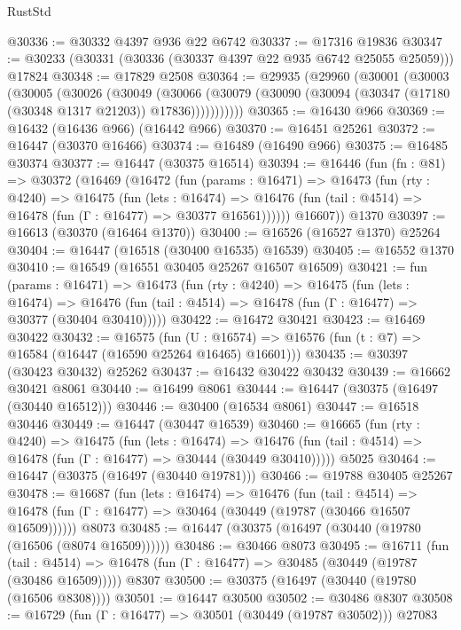 \begin{lexlean}{RustStd}
\begin{coremodule}
{\begin{coremodule}
{{{{{{{{{{{{{{{{{{{{{{{{{{{{{{{{{{{{{{{{{{{{{{{{{{{{{{{@30336 := @30332 @4397 @936 @22 @6742
@30337 := @17316 @19836
@30347 := @30233 (@30331 (@30336 (@30337 @4397 @22 @935 @6742 @25055 @25059))) @17824
@30348 := @17829 @2508
@30364 := @29935
    (@29960
      (@30001
        (@30003
          (@30005
            (@30026
              (@30049
                (@30066
                  (@30079 (@30090 (@30094 (@30347 (@17180 (@30348 @1317 @21203)) @17836)))))))))))
@30365 := @16430 @966
@30369 := @16432 (@16436 @966) (@16442 @966)
@30370 := @16451 @25261
@30372 := @16447 (@30370 @16466)
@30374 := @16489 (@16490 @966)
@30375 := @16485 @30374
@30377 := @16447 (@30375 @16514)
@30394 := @16446
    (fun (fn : @81) =>
    @30372
      (@16469
        (@16472
          (fun (params : @16471) =>
          @16473
            (fun (rty : @4240) =>
            @16475
              (fun (lets : @16474) =>
              @16476 (fun (tail : @4514) => @16478 (fun (Γ : @16477) => @30377 @16561))))))
        @16607))
    @1370
@30397 := @16613 (@30370 (@16464 @1370))
@30400 := @16526 (@16527 @1370) @25264
@30404 := @16447 (@16518 (@30400 @16535) @16539)
@30405 := @16552 @1370
@30410 := @16549 (@16551 @30405 @25267 @16507 @16509)
@30421 := fun (params : @16471) =>
  @16473
    (fun (rty : @4240) =>
    @16475
      (fun (lets : @16474) =>
      @16476 (fun (tail : @4514) => @16478 (fun (Γ : @16477) => @30377 (@30404 @30410)))))
@30422 := @16472 @30421
@30423 := @16469 @30422
@30432 := @16575
    (fun (U : @16574) => @16576 (fun (t : @7) => @16584 (@16447 (@16590 @25264 @16465) @16601)))
@30435 := @30397 (@30423 @30432) @25262
@30437 := @16432 @30422 @30432
@30439 := @16662 @30421 @8061
@30440 := @16499 @8061
@30444 := @16447 (@30375 (@16497 (@30440 @16512)))
@30446 := @30400 (@16534 @8061)
@30447 := @16518 @30446
@30449 := @16447 (@30447 @16539)
@30460 := @16665
    (fun (rty : @4240) =>
    @16475
      (fun (lets : @16474) =>
      @16476 (fun (tail : @4514) => @16478 (fun (Γ : @16477) => @30444 (@30449 @30410)))))
    @5025
@30464 := @16447 (@30375 (@16497 (@30440 @19781)))
@30466 := @19788 @30405 @25267
@30478 := @16687
    (fun (lets : @16474) =>
    @16476
      (fun (tail : @4514) =>
      @16478 (fun (Γ : @16477) => @30464 (@30449 (@19787 (@30466 @16507 @16509))))))
    @8073
@30485 := @16447 (@30375 (@16497 (@30440 (@19780 (@16506 (@8074 @16509))))))
@30486 := @30466 @8073
@30495 := @16711
    (fun (tail : @4514) => @16478 (fun (Γ : @16477) => @30485 (@30449 (@19787 (@30486 @16509)))))
    @8307
@30500 := @30375 (@16497 (@30440 (@19780 (@16506 @8308))))
@30501 := @16447 @30500
@30502 := @30486 @8307
@30508 := @16729 (fun (Γ : @16477) => @30501 (@30449 (@19787 @30502))) @27083
}}}}}}}}}}}}}}}}}}}}}}}}}}}}}}}}}}}}}}}}}}}}}}}}}}}}}}}
\end{coremodule}}
\end{coremodule}
\end{lexlean}
